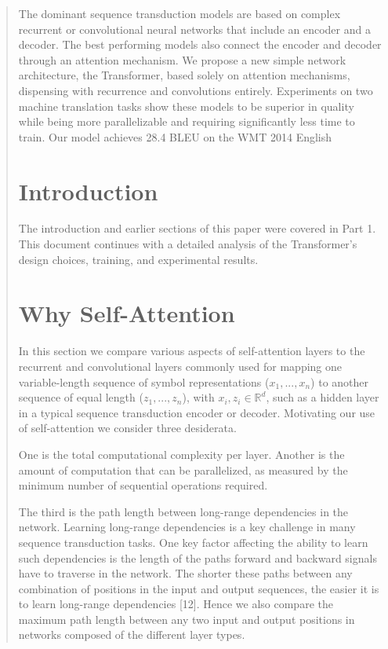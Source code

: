 \documentclass[12pt, a4paper]{article}
\begin{document}
\begin{abstract}
The dominant sequence transduction models are based on complex recurrent or convolutional neural networks that include an encoder and a decoder. The best performing models also connect the encoder and decoder through an attention mechanism. We propose a new simple network architecture, the Transformer, based solely on attention mechanisms, dispensing with recurrence and convolutions entirely. Experiments on two machine translation tasks show these models to be superior in quality while being more parallelizable and requiring significantly less time to train. Our model achieves 28.4 BLEU on the WMT 2014 English

\section{Introduction}
The introduction and earlier sections of this paper were covered in Part 1. This document continues with a detailed analysis of the Transformer's design choices, training, and experimental results.

\section{Why Self-Attention}
In this section we compare various aspects of self-attention layers to the recurrent and convolutional layers commonly used for mapping one variable-length sequence of symbol representations ($x_1,..., x_n$) to another sequence of equal length ($z_1,..., z_n$), with $x_i, z_i \in \mathbb{R}^d$, such as a hidden layer in a typical sequence transduction encoder or decoder. Motivating our use of self-attention we consider three desiderata.

One is the total computational complexity per layer. Another is the amount of computation that can be parallelized, as measured by the minimum number of sequential operations required.

The third is the path length between long-range dependencies in the network. Learning long-range dependencies is a key challenge in many sequence transduction tasks. One key factor affecting the ability to learn such dependencies is the length of the paths forward and backward signals have to traverse in the network. The shorter these paths between any combination of positions in the input and output sequences, the easier it is to learn long-range dependencies [12]. Hence we also compare the maximum path length between any two input and output positions in networks composed of the different layer types.


\end{abstract}
\end{document}
